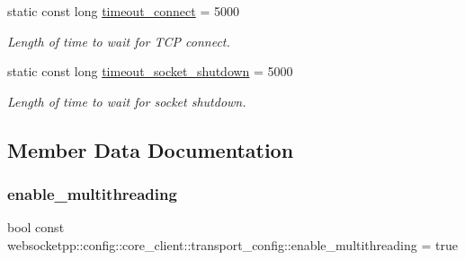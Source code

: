 \begin{DoxyCompactItemize}
\mbox{\label{structwebsocketpp_1_1config_1_1core__client_1_1transport__config_ab5516b1f6e73f0e7e3b66ec6cb759a94}} 
static const long \mbox{\hyperlink{structwebsocketpp_1_1config_1_1core__client_1_1transport__config_ab5516b1f6e73f0e7e3b66ec6cb759a94}{timeout\+\_\+connect}} = 5000
\begin{DoxyCompactList}\small\item\em Length of time to wait for T\+CP connect. \end{DoxyCompactList}\item 
\mbox{\label{structwebsocketpp_1_1config_1_1core__client_1_1transport__config_a1b3c52afc3596f891611208c0773bc8c}} 
static const long \mbox{\hyperlink{structwebsocketpp_1_1config_1_1core__client_1_1transport__config_a1b3c52afc3596f891611208c0773bc8c}{timeout\+\_\+socket\+\_\+shutdown}} = 5000
\begin{DoxyCompactList}\small\item\em Length of time to wait for socket shutdown. \end{DoxyCompactList}\end{DoxyCompactItemize}


\subsection{Member Data Documentation}
\mbox{\label{structwebsocketpp_1_1config_1_1core__client_1_1transport__config_a79238a5db7c8a95065e998309b4f424c}} 
\subsubsection{\texorpdfstring{enable\+\_\+multithreading}{enable\_multithreading}}
{\footnotesize\ttfamily bool const websocketpp\+::config\+::core\+\_\+client\+::transport\+\_\+config\+::enable\+\_\+multithreading = true\hspace{0.3cm}{\ttfamily [static]}}

